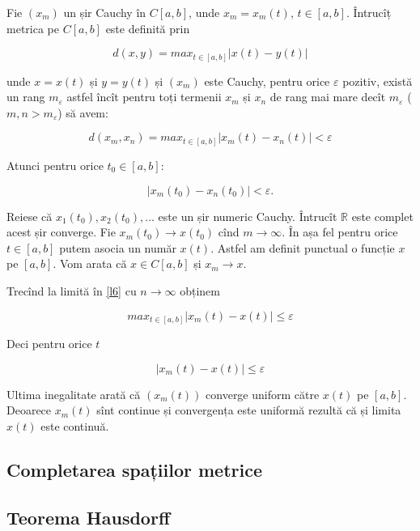 \documentclass[a4paper,12pt]{article}
\theoremstyle{change}
\newenvironment{proof}[1][Proof]{\begin{trivlist}
\item[\hskip \labelsep {\bfseries #1}]}{\end{trivlist}}
\begin{document}
\begin{proof}
Fie $(x_m)$ un șir Cauchy în $C[a,b]$, unde $x_m=x_m(t)$, $t\in [a,b]$. Întrucîț metrica pe $C[a,b]$ este definită prin

\[
  d(x,y) = max_{t\in [a,b]} |x(t)-y(t)|
\]

\noindent unde $x=x(t)$ și $y=y(t)$ și $(x_m)$ este Cauchy, pentru orice $\varepsilon$ pozitiv, există un rang $m_{\varepsilon}$ astfel încît pentru toți termenii $x_m$ și $x_n$ de rang mai mare decît $m_{\varepsilon}$ ($m,n>m_{\varepsilon}$) să avem:

\[
\label{l6}
d(x_m,x_n) = max_{t\in [a,b]} |x_m(t)-x_n(t)|<\varepsilon
\]

Atunci pentru orice $t_0\in [a,b]$:

\[
|x_m(t_0)-x_n(t_0)|<\varepsilon.
\]

Reiese că $x_1(t_0),x_2(t_0),...$ este un șir numeric Cauchy. Întrucît $\mathbb{R}$ este complet acest șir converge. Fie $x_m(t_0)\to x(t_0)$ cînd $m\to\infty$. În așa fel pentru orice $t\in[a,b]$ putem asocia un număr $x(t)$. Astfel am definit punctual o funcție $x$ pe $[a,b]$. Vom arata că $x\in C[a,b]$ și $x_m\to x$.

Trecînd la limită în \eqref{l6} cu $n\to\infty$ obținem

\[
max_{t\in [a,b]} |x_m(t)-x(t)|\leq \varepsilon
\]

Deci pentru orice $t$

\[
|x_m(t)-x(t)|\leq \varepsilon
\]

Ultima inegalitate arată că $(x_m(t))$ converge uniform către $x(t)$ pe $[a,b]$. Deoarece $x_m(t)$ sînt continue și convergența este uniformă rezultă că și limita $x(t)$ este continuă.
\end{proof}



\subsection{Completarea spațiilor metrice}

\subsection{Teorema Hausdorff}
\end{document}

